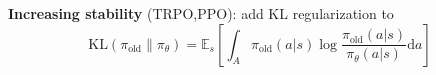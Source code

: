 \documentclass[10pt,landscape]{article}
\makeatletter
\renewcommand{\section}{\@startsection{section}{1}{0mm}%
                                {-1ex plus -.5ex minus -.2ex}%
                                {0.5ex plus .2ex}%
                                {\normalfont\large\bfseries}}
\makeatother
\begin{document}
\begin{multicols}{3}
\vspace{1mm}

\textbf{Increasing stability} (TRPO,PPO): add KL regularization to 
 $$
 \textrm{KL}(\pi_{\textrm{old}}\|\pi_\theta)=\mathbb{E}_s\left[\int_A\pi_{\textrm{old}}(a|s)
\log\frac{\pi_{\textrm{old}}(a|s)}{\pi_\theta(a|s)}
\textrm{d}a\right]
$$

\newpage
\FloatBarrier


%
%

\end{multicols}

%
%
%
\end{document}
